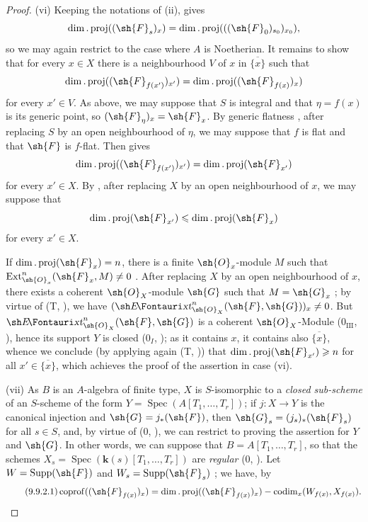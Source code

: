 \begin{proof}
(vi) Keeping the notations of (ii),  gives
\[
  \dim.\operatorname{proj}((\sh{F}_s)_x)
  =\dim.\operatorname{proj}(((\sh{F}_0)_{s_0})_{x_0}),
\]
so we may again restrict to the case where $A$ is Noetherian. It remains to show that for every $x\in X$ there is a neighbourhood $V$ of $x$ in $\overline{\{x\}}$ such that
\[
  \dim.\operatorname{proj}((\sh{F}_{f(x')})_{x'})
  =\dim.\operatorname{proj}((\sh{F}_{f(x)})_x)
\]
for every $x'\in V$. As above, we may suppose that $S$ is integral and that $\eta=f(x)$ is its generic point, so $(\sh{F}_\eta)_x=\sh{F}_x$. By generic flatness , after replacing $S$ by an open neighbourhood of $\eta$, we may suppose that $f$ is flat and that $\sh{F}$ is $f$-flat. Then  gives
\[
  \dim.\operatorname{proj}((\sh{F}_{f(x')})_{x'})
  =\dim.\operatorname{proj}(\sh{F}_{x'})
\]
for every $x'\in X$. By , after replacing $X$ by an open neighbourhood of $x$, we may suppose that
\[
  \dim.\operatorname{proj}(\sh{F}_{x'})
  \leqslant\dim.\operatorname{proj}(\sh{F}_x)
\]
for every $x'\in X$.

If $\dim.\operatorname{proj}(\sh{F}_x)=n$, there is a finite $\sh{O}_x$-module $M$ such that $\operatorname{Ext}^n_{\sh{O}_x}(\sh{F}_x,M)\neq 0$ .
After replacing $X$ by an open neighbourhood of $x$, there exists a coherent $\sh{O}_X$-module $\sh{G}$ such that $M=\sh{G}_x$ ;
by virtue of (T, ), we have $(\shExt^n_{\sh{O}_X}(\sh{F},\sh{G}))_x\neq 0$.
But $\shExt^n_{\sh{O}_X}(\sh{F},\sh{G})$ is a coherent $\sh{O}_X$-Module ($0_{\mathrm{III}}$, ), hence its support $Y$ is closed ($0_I$, ); as it contains $x$, it contains also $\overline{\{x\}}$, whence we conclude (by applying again (T, )) that $\dim.\operatorname{proj}(\sh{F}_{x'})\geqslant n$ for all $x'\in\overline{\{x\}}$, which achieves the proof of the assertion in case (vi).

(vii) As $B$ is an $A$-algebra of finite type, $X$ is $S$-isomorphic to a \emph{closed sub-scheme} of an $S$-scheme of the form $Y=\operatorname{Spec}(A[T_1,\ldots,T_r])$; if $j:X\to Y$ is the canonical injection and $\sh{G}=j_*(\sh{F})$, then $\sh{G}_s=(j_s)_*(\sh{F}_s)$ for all $s\in S$, and, by virtue of ($0$, ), we can restrict to proving the assertion for $Y$ and $\sh{G}$.
In other words, we can suppose that $B=A[T_1,\ldots,T_r]$, so that the schemes $X_s=\operatorname{Spec}(\mathbf{k}(s)[T_1,\ldots,T_r])$ are \emph{regular} ($0$, ).
Let $W=\operatorname{Supp}(\sh{F})$ and $W_s=\operatorname{Supp}(\sh{F}_s)$ ; we have, by 
\begin{equation}
\tag{9.9.2.1}
\label{IV.9.9.2.1}
  \operatorname{coprof}((\sh{F}_{f(x)})_x)=\dim.\operatorname{proj}((\sh{F}_{f(x)})_x)-\operatorname{codim}_x(W_{f(x)},X_{f(x)}).
\end{equation}


\end{proof}
